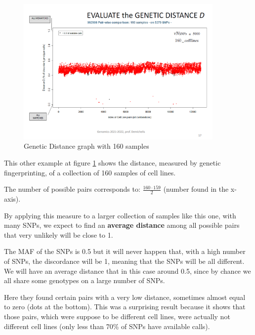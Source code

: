 \begin{figure}[H]
	\centering
	\includegraphics[width=0.9\textwidth]{Distance2.PNG}
	\caption{\label{fig:Distance2}Genetic Distance graph with 160 samples}
\end{figure}

\bigskip
This other example at figure \ref{fig:Distance2} shows the distance, measured by
genetic fingerprinting, of a collection of 160 samples of cell lines. 

The number of possible pairs corresponds to: $\frac{160 \cdot 159}{2}$ (number
found in the x-axis). 

By applying this measure to a larger collection of samples like this one, with
many SNPs, we expect to find an \textbf{average distance} among all possible
pairs that very unlikely will be close to 1. 

The MAF of the SNPs is 0.5 but it will never happen that, with a high number of
SNPs, the discordance will be 1, meaning that the SNPs will be all different. We
will have an average distance that in this case around 0.5, since by chance we
all share some genotypes on a large number of SNPs. 

Here they found certain pairs with a very low distance, sometimes almost equal
to zero (dots at the bottom). This was a surprising result because it shows that
those pairs, which were suppose to be different cell lines, were actually not
different cell lines (only less than 70\% of SNPs have available calls). 


